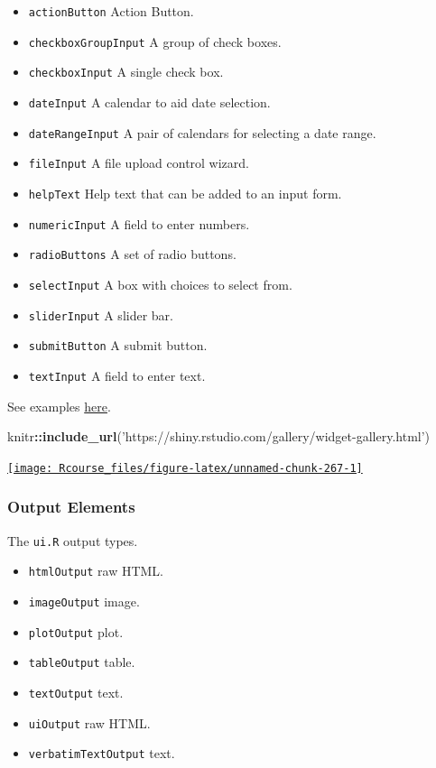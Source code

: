 \documentclass[]{book}
\newenvironment{Shaded}{\begin{snugshade}}{\end{snugshade}}
\newcommand{\KeywordTok}[1]{\textcolor[rgb]{0.13,0.29,0.53}{\textbf{#1}}}
\newcommand{\StringTok}[1]{\textcolor[rgb]{0.31,0.60,0.02}{#1}}
\newcommand{\OperatorTok}[1]{\textcolor[rgb]{0.81,0.36,0.00}{\textbf{#1}}}
\newcommand{\NormalTok}[1]{#1}
\providecommand{\tightlist}{%
  \setlength{\itemsep}{0pt}\setlength{\parskip}{0pt}}
\theoremstyle{definition}
\theoremstyle{definition}
\theoremstyle{definition}
\theoremstyle{remark}
\begin{document}
\begin{itemize}
\tightlist
\item
  \texttt{actionButton} Action Button.
\item
  \texttt{checkboxGroupInput} A group of check boxes.
\item
  \texttt{checkboxInput} A single check box.
\item
  \texttt{dateInput} A calendar to aid date selection.
\item
  \texttt{dateRangeInput} A pair of calendars for selecting a date
  range.
\item
  \texttt{fileInput} A file upload control wizard.
\item
  \texttt{helpText} Help text that can be added to an input form.
\item
  \texttt{numericInput} A field to enter numbers.
\item
  \texttt{radioButtons} A set of radio buttons.
\item
  \texttt{selectInput} A box with choices to select from.
\item
  \texttt{sliderInput} A slider bar.
\item
  \texttt{submitButton} A submit button.
\item
  \texttt{textInput} A field to enter text.
\end{itemize}

See examples
\href{https://shiny.rstudio.com/gallery/widget-gallery.html}{here}.

\begin{Shaded}
\begin{Highlighting}[]
\NormalTok{knitr}\OperatorTok{::}\KeywordTok{include_url}\NormalTok{(}\StringTok{'https://shiny.rstudio.com/gallery/widget-gallery.html'}\NormalTok{)}
\end{Highlighting}
\end{Shaded}

\href{https://shiny.rstudio.com/gallery/widget-gallery.html}{\texttt{[image: Rcourse\_files/figure-latex/unnamed-chunk-267-1]} }

\subsubsection{Output Elements}\label{output-elements}

The \texttt{ui.R} output types.

\begin{itemize}
\tightlist
\item
  \texttt{htmlOutput} raw HTML.
\item
  \texttt{imageOutput} image.
\item
  \texttt{plotOutput} plot.
\item
  \texttt{tableOutput} table.
\item
  \texttt{textOutput} text.
\item
  \texttt{uiOutput} raw HTML.
\item
  \texttt{verbatimTextOutput} text.
\end{itemize}
\end{document}
